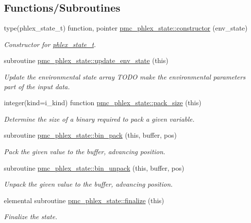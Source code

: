 \subsection*{Functions/\+Subroutines}
\begin{DoxyCompactItemize}
\item 
type(phlex\+\_\+state\+\_\+t) function, pointer \mbox{\hyperlink{namespacepmc__phlex__state_af303f5284fd8e824bef403c5a1b93603}{pmc\+\_\+phlex\+\_\+state\+::constructor}} (env\+\_\+state)
\begin{DoxyCompactList}\small\item\em Constructor for \mbox{\hyperlink{structpmc__phlex__state_1_1phlex__state__t}{phlex\+\_\+state\+\_\+t}}. \end{DoxyCompactList}\item 
subroutine \mbox{\hyperlink{namespacepmc__phlex__state_aaf068a64f451138607dc89796065f06f}{pmc\+\_\+phlex\+\_\+state\+::update\+\_\+env\+\_\+state}} (this)
\begin{DoxyCompactList}\small\item\em Update the environmental state array T\+O\+DO make the environmental parameters part of the input data. \end{DoxyCompactList}\item 
integer(kind=i\+\_\+kind) function \mbox{\hyperlink{namespacepmc__phlex__state_a58739e1d06ecd1cfe62aa5463602dacd}{pmc\+\_\+phlex\+\_\+state\+::pack\+\_\+size}} (this)
\begin{DoxyCompactList}\small\item\em Determine the size of a binary required to pack a given variable. \end{DoxyCompactList}\item 
subroutine \mbox{\hyperlink{namespacepmc__phlex__state_ada3a9947f2dc64ffcd190bb17979fa47}{pmc\+\_\+phlex\+\_\+state\+::bin\+\_\+pack}} (this, buffer, pos)
\begin{DoxyCompactList}\small\item\em Pack the given value to the buffer, advancing position. \end{DoxyCompactList}\item 
subroutine \mbox{\hyperlink{namespacepmc__phlex__state_a9ee8fdc8ccba764c81837d8a00de6f80}{pmc\+\_\+phlex\+\_\+state\+::bin\+\_\+unpack}} (this, buffer, pos)
\begin{DoxyCompactList}\small\item\em Unpack the given value to the buffer, advancing position. \end{DoxyCompactList}\item 
elemental subroutine \mbox{\hyperlink{namespacepmc__phlex__state_abf02a2ecb17713c79ca09e71abbb7c07}{pmc\+\_\+phlex\+\_\+state\+::finalize}} (this)
\begin{DoxyCompactList}\small\item\em Finalize the state. \end{DoxyCompactList}\end{DoxyCompactItemize}


